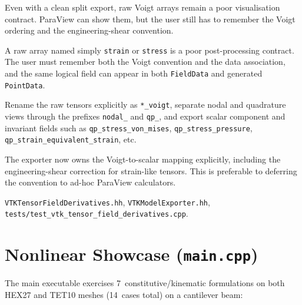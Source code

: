\begin{description}[leftmargin=0pt,style=nextline]
  \item[Context] Even with a clean split export, raw Voigt arrays remain a poor
    visualisation contract.  ParaView can show them, but the user still has to
    remember the Voigt ordering and the engineering-shear convention.

  \item[Problem] A raw array named simply \texttt{strain} or \texttt{stress}
    is a poor post-processing contract.  The user must remember both the Voigt
    convention and the data association, and the same logical field can appear
    in both \texttt{FieldData} and generated \texttt{PointData}.

  \item[Decision] Rename the raw tensors explicitly as
    \texttt{*\_voigt}, separate nodal and quadrature views through the
    prefixes \texttt{nodal\_} and \texttt{qp\_}, and export scalar component
    and invariant fields such as
    \texttt{qp\_stress\_von\_mises},
    \texttt{qp\_stress\_pressure},
    \texttt{qp\_strain\_equivalent\_strain}, etc.

  \item[Architectural consequence] The exporter now owns the Voigt-to-scalar
    mapping explicitly, including the engineering-shear correction for
    strain-like tensors.  This is preferable to deferring the convention to
    ad-hoc ParaView calculators.

  \item[Source] \texttt{VTKTensorFieldDerivatives.hh},
    \texttt{VTKModelExporter.hh},
    \texttt{tests/test\_vtk\_tensor\_field\_derivatives.cpp}.
\end{description}


\section{Nonlinear Showcase (\texttt{main.cpp})}
\label{sec:showcase}

The main executable exercises 7~constitutive/kinematic formulations on both
HEX27 and TET10 meshes (14~cases total) on a cantilever beam:

